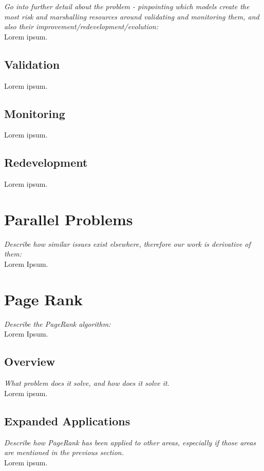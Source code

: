 \documentclass[twoside,11pt]{article}
\begin{document}
{\noindent \em Go into further detail about the problem - pinpointing which models create the most risk and marshalling resources around validating and monitoring them, and also their improvement/redevelopment/evolution:}\\
Lorem ipsum.\\

\subsection{Validation}
Lorem ipsum.\\

\subsection{Monitoring}
Lorem ipsum.\\

\subsection{Redevelopment}
Lorem ipsum.\\


\section{Parallel Problems}
{\noindent \em Describe how similar issues exist elsewhere, therefore our work is derivative of them:}\\
Lorem Ipsum.\\


\section{Page Rank}
{\noindent \em Describe the PageRank algorithm:}\\
Lorem Ipsum.\\

\subsection{Overview}
{\noindent \em What problem does it solve, and how does it solve it.}\\
Lorem ipsum.\\

\subsection{Expanded Applications}
{\noindent \em Describe how PageRank has been applied to other areas, especially if those areas are mentioned in the previous section.}\\
Lorem ipsum.\\
\end{document}
